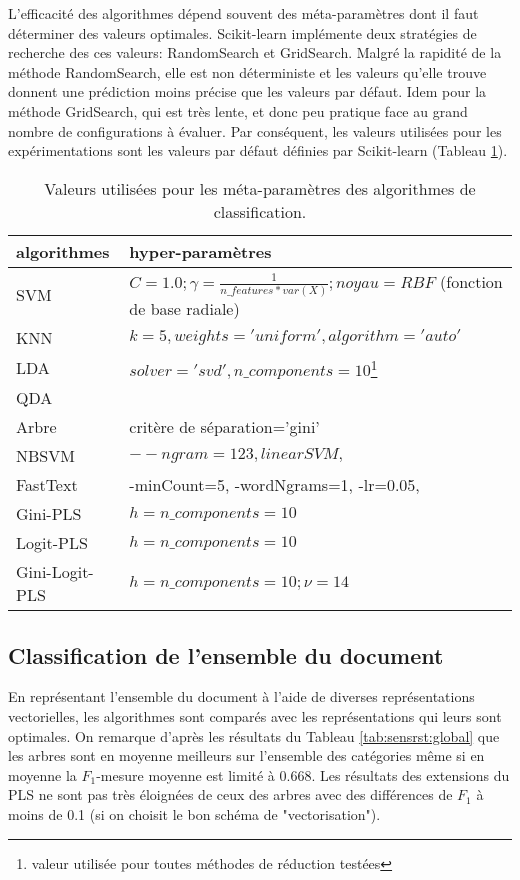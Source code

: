 L'efficacité des algorithmes dépend souvent des méta-paramètres dont il faut déterminer des valeurs optimales. Scikit-learn implémente deux stratégies de recherche des ces valeurs: RandomSearch et GridSearch. Malgré la rapidité de la méthode RandomSearch, elle est non déterministe et les valeurs qu'elle trouve donnent une prédiction moins précise que les valeurs par défaut. Idem pour la méthode GridSearch, qui est très lente, et donc peu pratique face au grand nombre de configurations à évaluer. Par conséquent, les valeurs utilisées pour les expérimentations sont les valeurs par défaut définies par Scikit-learn (Tableau \ref{tab:sensrst:metapara}).

\begin{table}[htb]
	\scriptsize
	\centering
	\begin{tabular}{|l|p{}|}
		\hline
		algorithmes & hyper-paramètres\\ \hline
		SVM & $C=1.0; \gamma=\frac{1}{n\_features * var(X)}; noyau=RBF$ (fonction de base radiale)\\ \hline
		KNN & $k = 5, weights='uniform', algorithm='auto'$ \\ \hline
		LDA & $solver='svd', n\_components=10$\footnote{valeur utilisée pour toutes méthodes de réduction testées} \\ \hline
		QDA & \\ \hline
		Arbre & critère de séparation='gini' \\ \hline
		NBSVM & $--ngram=123, linearSVM, $ \\ \hline
		FastText & -minCount=5, -wordNgrams=1, -lr=0.05, \\ \hline
		Gini-PLS & $h=n\_components=10$ \\ \hline
		Logit-PLS & $h=n\_components=10$ \\ \hline
		Gini-Logit-PLS & $h=n\_components=10; \nu = 14$ \\ \hline
	\end{tabular}
	\caption{Valeurs utilisées pour les méta-paramètres des algorithmes de classification.}\label{tab:sensrst:metapara}
\end{table}

%
\subsection{Classification de l'ensemble du document}

En représentant l'ensemble du document à l'aide de diverses représentations vectorielles, les algorithmes sont comparés avec les représentations qui leurs sont optimales. On remarque d'après les résultats du Tableau \ref{tab:sensrst:global} que les arbres sont en moyenne meilleurs sur l'ensemble des catégories même si en moyenne la $F_1$-mesure moyenne est limité à 0.668. Les résultats des extensions du PLS ne sont pas très éloignées de ceux des arbres avec des différences de $F_1$ à moins de 0.1 (si on choisit le bon schéma de "vectorisation").

